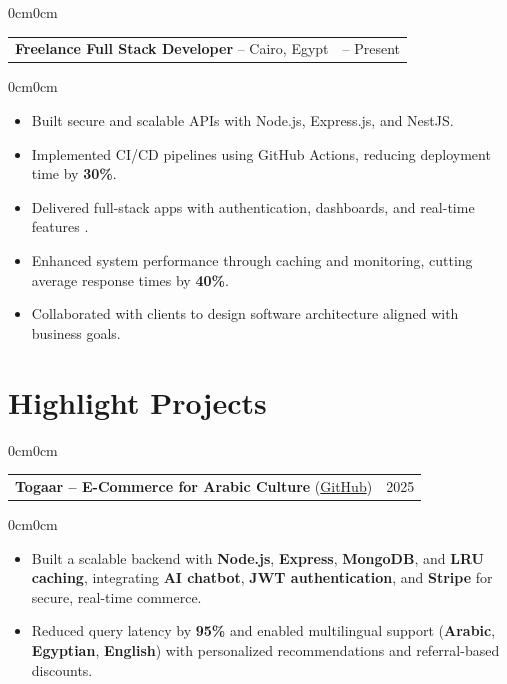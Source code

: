 \documentclass[10pt, letterpaper]{article}
\newenvironment{highlights}{
    \begin{itemize}[topsep=0.10 cm,parsep=0.10 cm,partopsep=0pt,itemsep=0pt,leftmargin=10pt]
}{
    \end{itemize}
}
\newenvironment{onecolentry}{\begin{adjustwidth}{0cm}{0cm}}{\end{adjustwidth}}
\begin{document}
\begin{adjustwidth}{0cm}{0cm}
\begin{tabularx}{\textwidth}{@{} >{\raggedright\arraybackslash}X >{\raggedleft\arraybackslash}p{4.5cm} @{}}
\textbf{Freelance Full Stack Developer} – Cairo, Egypt & 2025 – Present \\
\end{tabularx}
\end{adjustwidth}

\begin{onecolentry}
\begin{highlights}
    \item Built secure and scalable APIs with Node.js, Express.js, and NestJS.
    \item Implemented CI/CD pipelines using GitHub Actions, reducing deployment time by \textbf{30\%}.
    \item Delivered full-stack apps with authentication, dashboards, and real-time features .
        \item Enhanced system performance through caching and monitoring, cutting average response times by \textbf{40\%}.

    \item Collaborated with clients to design software architecture aligned with business goals.
\end{highlights}
\end{onecolentry}

\section{Highlight Projects}


\begin{adjustwidth}{0cm}{0cm}
\begin{tabularx}{\textwidth}{X r}
\textbf{Togaar – E-Commerce for Arabic Culture} (\href{https://github.com/HasanOmarHasan/Togaar-E-Commerce-for-Arabic-Culture}{GitHub}) & 2025 \\
\end{tabularx}
\end{adjustwidth}
\begin{onecolentry}
\begin{highlights}
 \item Built a scalable backend with \textbf{Node.js}, \textbf{Express}, \textbf{MongoDB}, and \textbf{LRU caching}, integrating \textbf{AI chatbot}, \textbf{JWT authentication}, and \textbf{Stripe} for secure, real-time commerce.
  \item Reduced query latency by \textbf{95\%} and enabled multilingual support (\textbf{Arabic}, \textbf{Egyptian}, \textbf{English}) with personalized recommendations and referral-based discounts.
\end{highlights}
\end{onecolentry}
\end{document}

